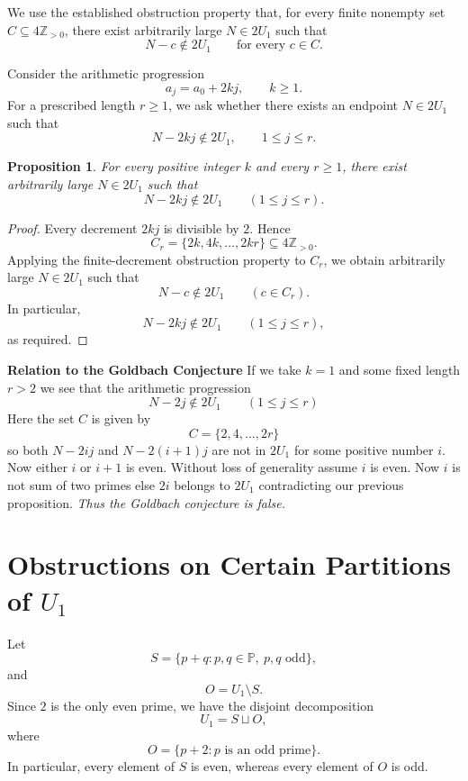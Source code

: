 \documentclass[11pt]{article}
\newtheorem{proposition}{Proposition}
\newcommand{\Primes}{\mathbb{P}}
\begin{document}
	We use the established obstruction property that, for every
	finite nonempty set
	$C\subseteq 4\mathbb{Z}_{>0}$, there exist arbitrarily
	large $N\in 2U_1$ such that
	\[
	N-c\notin 2U_1\qquad\text{for every }c\in C.
	\]
	
	Consider the arithmetic progression
	\[
	a_j=a_0+2kj,\qquad k\geq 1.
	\]
	For a prescribed length $r\geq 1$, we ask whether there
	exists an endpoint $N\in 2U_1$ such that
	\[
	N-2kj\notin 2U_1,\qquad 1\leq j\leq r.
	\]
	
	\begin{proposition}
		For every positive integer $k$ and every $r\geq 1$,
		there exist arbitrarily large $N\in 2U_1$ such that
		\[
		N-2kj\notin 2U_1
		\qquad (1\leq j\leq r).
		\]
	\end{proposition}
	
	\begin{proof}
		Every decrement $2kj$ is divisible by
		$2$. Hence
		\[
		C_r=\{2k,4k,\ldots,2kr\}
		\subseteq 4\mathbb{Z}_{>0}.
		\]
		Applying the finite-decrement obstruction property to
		$C_r$, we obtain arbitrarily large $N\in 2U_1$ such that
		\[
		N-c\notin 2U_1\qquad(c\in C_r).
		\]
		In particular,
		\[
		N-2kj\notin 2U_1\qquad(1\leq j\leq r),
		\]
		as required.
	\end{proof}
	
	\textbf{Relation to the Goldbach Conjecture}
	If we take $k=1$ and some fixed length $r > 2$ we see that the arithmetic progression
	\[ N-2j \notin 2U_1 \qquad (1\leq j\leq r) \]
	Here the set $C$ is given by
	\[ C = \{2,4,\ldots,2r\} \]
	so both $N-2ij$ and $N-2(i+1)j$ are not in $2U_1$ for some positive number $i$. Now either $i$ or $i+1$ is even. Without loss of generality assume $i$ is even. Now $i$ is not sum of two primes else $2i$ belongs to $2U_1$ contradicting our previous proposition. \textit{Thus the Goldbach conjecture is false.}
	
	
	\section{Obstructions on Certain Partitions of $U_1$}%
	
		Let \[
	S=\{p+q:p,q\in\Primes,\ p,q\text{ odd}\},
	\]
	and
	\[
	O=U_1\setminus S.
	\]
	Since $2$ is the only even prime, we have the disjoint decomposition
	\[
	\boxed{U_1=S\sqcup O},
	\]
	where
	\[
	O=\{p+2:p\text{ is an odd prime}\}.
	\]
	In particular, every element of $S$ is even, whereas every
	element of $O$ is odd.
	
\end{document}
